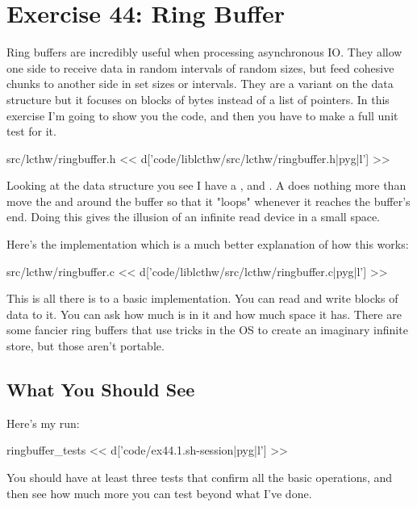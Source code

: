 \chapter{Exercise 44: Ring Buffer}

Ring buffers are incredibly useful when processing asynchronous IO.  They allow
one side to receive data in random intervals of random sizes, but feed cohesive
chunks to another side in set sizes or intervals.  They are a variant on the 
 data structure but it focuses on blocks of bytes instead of
a list of pointers.  In this exercise I'm going to show you the 
 code, and then you have to make a full unit test
for it.

\begin{code}{src/lcthw/ringbuffer.h}
<< d['code/liblcthw/src/lcthw/ringbuffer.h|pyg|l'] >>
\end{code}

Looking at the data structure you see I have a , 
 and .  A  does nothing
more than move the  and  around the buffer
so that it "loops" whenever it reaches the buffer's end.  Doing
this gives the illusion of an infinite read device in a small space.

Here's the implementation which is a much better explanation of how
this works:

\begin{code}{src/lcthw/ringbuffer.c}
<< d['code/liblcthw/src/lcthw/ringbuffer.c|pyg|l'] >>
\end{code}

This is all there is to a basic  implementation.  You
can read and write blocks of data to it.  You can ask how much is in it
and how much space it has.  There are some fancier ring buffers that use
tricks in the OS to create an imaginary infinite store, but those aren't
portable.


\section{What You Should See}

Here's my  run:

\begin{code}{ringbuffer\_tests}
<< d['code/ex44.1.sh-session|pyg|l'] >>
\end{code}

You should have at least three tests that confirm all the basic operations,
and then see how much more you can test beyond what I've done.

